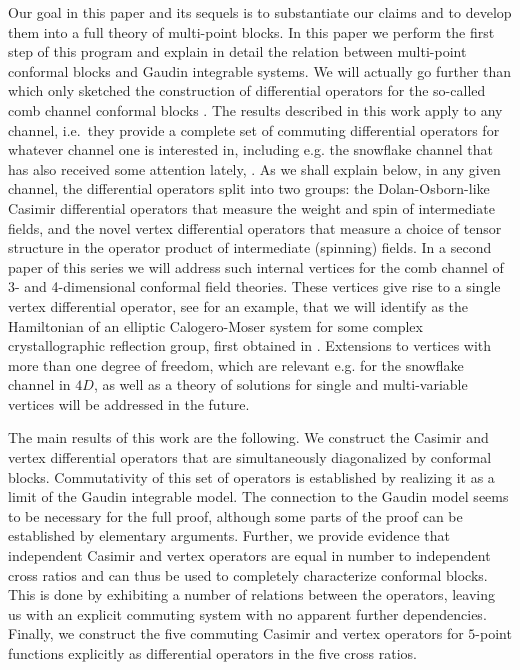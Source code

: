 \documentclass{article}
\begin{document}
Our goal in this paper and its sequels is to substantiate our claims and to develop 
them into a full theory of multi-point blocks. In this paper we perform the first 
step of this program and explain in detail the relation between multi-point conformal 
blocks and Gaudin integrable systems. We will actually go further than \cite{Buric:2020dyz} which only sketched the construction of differential operators
for the so-called comb channel conformal blocks \cite{Rosenhaus:2018zqn}. The results 
described in this work apply to any channel, i.e.\ they provide a complete set of 
commuting differential operators for whatever channel one is interested in, including 
e.g. the snowflake channel that has also received some attention lately, 
\cite{Fortin:2020yjz,Fortin:2020bfq}. As we shall explain below, 
in any given channel, the differential operators split into two groups: the Dolan-Osborn-like Casimir differential operators that measure the weight and spin of intermediate 
fields, and the novel vertex differential operators that measure a choice of tensor 
structure in the operator product of intermediate (spinning) fields. In a second 
paper of this series we will address such internal vertices for the comb channel 
of 3- and 4-dimensional conformal field theories. These vertices give rise to a 
single vertex differential operator, see \cite{Buric:2020dyz} for an example, that 
we will identify as the Hamiltonian of 
an elliptic Calogero-Moser system for some complex crystallographic reflection group, first obtained 
in \cite{etingof2021elliptic}. Extensions to vertices with more than one degree of freedom, which are relevant e.g. for the snowflake channel in $4D$, as well as a theory of 
solutions for single and multi-variable vertices will be addressed in the future.  
\medskip 

The main results of this work are the following. We construct the Casimir and 
vertex differential operators that are simultaneously diagonalized by conformal blocks. 
Commutativity of this set of operators is established by realizing it as a limit of the 
Gaudin integrable model. The connection to the Gaudin model seems to be necessary for the 
full proof, although some parts of the proof can be established by elementary arguments. 
Further, we provide evidence that independent Casimir and vertex operators are equal in 
number to independent cross ratios and can thus be used to completely characterize conformal blocks. 
This is done by exhibiting a number of relations between the operators, leaving us with 
an explicit commuting system with no apparent further dependencies. Finally, we construct 
the five commuting Casimir and vertex operators for $5$-point functions explicitly as
differential operators in the five cross ratios. 
\end{document}
